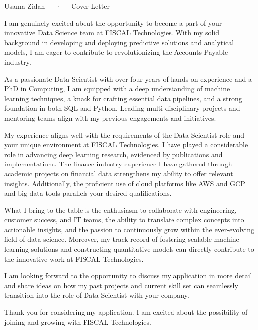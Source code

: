 \documentclass[11pt, a4paper]{awesome-cv}
\begin{document}
\makecvheader

\makecvfooter
  {}
  {Usama Zidan~~~·~~~Cover Letter}
  {}

\makelettertitle

\begin{cvletter}


I am genuinely excited about the opportunity to become a part of your innovative Data Science team at FISCAL Technologies. With my solid background in developing and deploying predictive solutions and analytical models, I am eager to contribute to revolutionizing the Accounts Payable industry.


As a passionate Data Scientist with over four years of hands-on experience and a PhD in Computing, I am equipped with a deep understanding of machine learning techniques, a knack for crafting essential data pipelines, and a strong foundation in both SQL and Python. Leading multi-disciplinary projects and mentoring teams align with my previous engagements and initiatives. 


My experience aligns well with the requirements of the Data Scientist role and your unique environment at FISCAL Technologies. I have played a considerable role in advancing deep learning research, evidenced by publications and implementations. The finance industry experience I have gathered through academic projects on financial data strengthens my ability to offer relevant insights. Additionally, the proficient use of cloud platforms like AWS and GCP and big data tools parallels your desired qualifications.

What I bring to the table is the enthusiasm to collaborate with engineering, customer success, and IT teams, the ability to translate complex concepts into actionable insights, and the passion to continuously grow within the ever-evolving field of data science. Moreover, my track record of fostering scalable machine learning solutions and constructing quantitative models can directly contribute to the innovative work at FISCAL Technologies.

I am looking forward to the opportunity to discuss my application in more detail and share ideas on how my past projects and current skill set can seamlessly transition into the role of Data Scientist with your company. 

Thank you for considering my application. I am excited about the possibility of joining and growing with FISCAL Technologies.

\end{cvletter}

\makeletterclosing
\end{document}
